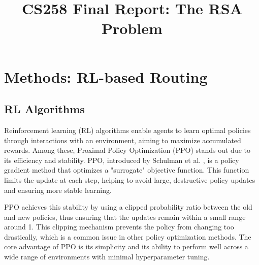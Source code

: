 \documentclass[conference]{IEEEtran}
\begin{document}
\def\authorone{Han Qiu}
\def\groupid{2}
\title{CS258 Final Report: The RSA Problem}
\author{
    \IEEEauthorblockN{\authorone}
    \IEEEauthorblockA{
        Group \groupid
    }    
}

\maketitle
\IEEEpeerreviewmaketitle


\section{Methods: RL-based Routing}
\subsection{RL Algorithms}
Reinforcement learning (RL) algorithms enable agents to learn optimal policies through interactions with an environment, aiming to maximize accumulated rewards. Among these, Proximal Policy Optimization (PPO) stands out due to its efficiency and stability. PPO, introduced by Schulman et al. \cite{schulman2017proximal}, is a policy gradient method that optimizes a "surrogate" objective function. This function limits the update at each step, helping to avoid large, destructive policy updates and ensuring more stable learning.

PPO achieves this stability by using a clipped probability ratio between the old and new policies, thus ensuring that the updates remain within a small range around 1. This clipping mechanism prevents the policy from changing too drastically, which is a common issue in other policy optimization methods. The core advantage of PPO is its simplicity and its ability to perform well across a wide range of environments with minimal hyperparameter tuning.
\end{document}
